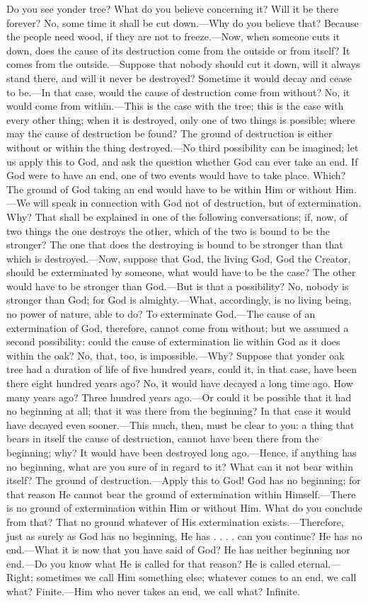 Do you see yonder tree? What do you believe concerning it? Will it be there forever? No, some time it shall be cut down.—Why do you believe that? Because the people need wood, if they are not to freeze.—Now, when someone cuts it down, does the cause of its destruction come from the outside or from itself? It comes from the outside.—Suppose that nobody should cut it down, will it always stand there, and will it never be destroyed? Sometime it would decay and cease to be.—In that case, would the cause of destruction come from without? No, it would come from within.—This is the case with the tree; this is the case with every other thing; when it is destroyed, only one of two things is possible; where may the cause of destruction be found? The ground of destruction is either without or within the thing destroyed.—No third possibility can be imagined; let us apply this to God, and ask the question whether God can ever take an end. If God were to have an end, one of two events would have to take place. Which? The ground of God taking an end would have to be within Him or without Him.—We will speak in connection with God not of destruction, but of extermination. Why? That shall be explained in one of the following conversations; if, now, of two things the one destroys the other, which of the two is bound to be the stronger? The one that does the destroying is bound to be stronger than that which is destroyed.—Now, suppose that God, the living God, God the Creator, should be exterminated by someone, what would have to be the case? The other would have to be stronger than God.—But is
that a possibility? No, nobody is stronger than God; for God is almighty.—What, accordingly, is no living being, no power of nature, able to do? To exterminate God.—The cause of an extermination of God, therefore, cannot come from without; but we assumed a second possibility: could the cause of extermination lie within God as it does within the oak? No, that, too, is impossible.—Why? Suppose that yonder oak tree had a duration of life of five hundred years, could it, in that case, have been there eight hundred years ago? No, it would have decayed a long time ago. How many years ago? Three hundred years ago.—Or could it be possible that it had no beginning at all; that it was there from the beginning? In that case it would have decayed even sooner.—This much, then, must be clear to you: a thing that bears in itself the cause of destruction, cannot have been there from the beginning; why? It would have been destroyed long ago.—Hence, if anything has no beginning, what are you sure of in regard to it? What can it not bear within itself? The ground of destruction.—Apply this to God! God has no beginning; for that reason He cannot bear the ground of extermination within Himself.—There is no ground of extermination within Him or without Him. What do you conclude from that? That no ground whatever of His extermination exists.—Therefore, just as surely as God has no beginning, He has . . . . can you continue? He has no end.—What it is now that you have said of God? He has neither beginning nor end.—Do you know what He is called for that reason? He is called eternal.—Right; sometimes we call Him something else; whatever comes to an end, we call what? Finite.—Him who never takes an end, we call what? Infinite.

